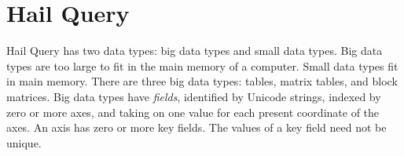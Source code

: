 \documentclass[10pt,a4paper%
]{article}
\begin{document}









\section{Hail Query}

Hail Query has two data types: big data types and small data types. Big data types are too large to
fit in the main memory of a computer. Small data types fit in main memory. There are three big data
types: tables, matrix tables, and block matrices. Big data types have \emph{fields}, identified by
Unicode strings, indexed by zero or more axes, and taking on one value for each present coordinate
of the axes. An axis has zero or more key fields. The values of a key field need not be
unique.
\end{document}
